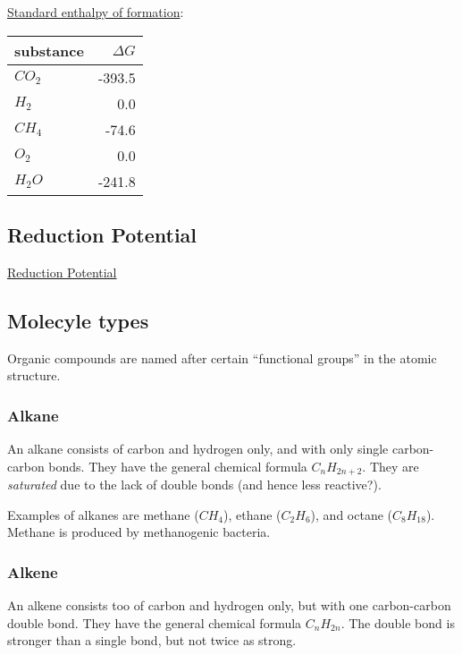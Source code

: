 \documentclass{article}
\begin{document}
\href{https://en.wikipedia.org/wiki/Standard_enthalpy_of_formation}{Standard enthalpy of
formation}:

\begin{tabular}{l  r}         \toprule
    substance & $\Delta G$ \\ \midrule
    $CO_2$    & -393.5     \\
    $H_2$     & 0.0        \\
    $CH_4$    & -74.6      \\
    $O_2$     & 0.0        \\
    $H_2O$    & -241.8     \\ \bottomrule
\end{tabular}


\subsection{Reduction Potential}
\href{https://en.wikipedia.org/wiki/Table_of_standard_reduction_potentials_for_half-reactions_important_in_biochemistry}{Reduction
Potential}

\subsection{Molecyle types}

Organic compounds are named after certain ``functional groups'' in the atomic structure.

\subsubsection{Alkane}

An alkane consists of carbon and hydrogen only, and with only single carbon-carbon bonds.
They have the general chemical formula $C_{n}H_{2n+2}$. They are {\em saturated\/}
due to the lack of double bonds (and hence less reactive?).

Examples of alkanes are methane ($CH_4$), ethane ($C_2H_6$), and octane ($C_{8}H_{18}$).
Methane is produced by methanogenic bacteria.

\subsubsection{Alkene}

An alkene consists too of carbon and hydrogen only, but with one carbon-carbon double bond.
They have the general chemical formula $C_{n}H_{2n}$. The double bond is stronger than
a single bond, but not twice as strong.
\end{document}
